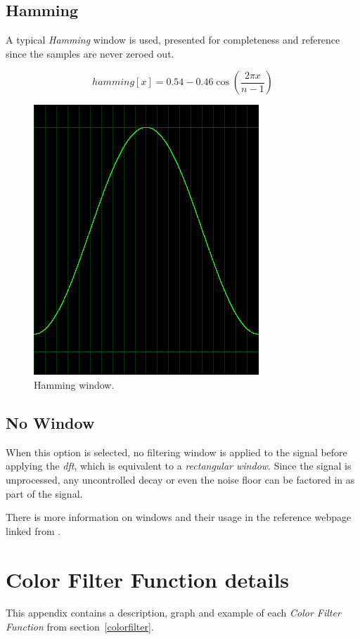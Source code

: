 \documentclass[10pt,a4paper]{report}
\newcommand{\ac}[1]{\textit{\mbox{\acrshort{#1}}}}
\begin{document}
\begin{appendices}
\section{Hamming}
A typical \textit{Hamming} window is used, presented for completeness and reference since the samples are never zeroed out.

\begin{equation}
hamming[x] = 0.54 - 0.46\cos(\frac{2\pi x}{n-1})
\end{equation}

\begin{figure}[H]
	\centering
	\includegraphics[width=0.4\linewidth]{images/windows/window-hamming.png}
	\caption[Hamming window]{Hamming window.}
	\label{fig:window-hamming}
\end{figure}

\section{No Window}

When this option is selected, no filtering window is applied to the signal before applying the \ac{dft}, which is equivalent to a \textit{rectangular window}. Since the signal is unprocessed, any uncontrolled decay or even the noise floor can be factored in as part of the signal.

There is more information on windows and their usage in the reference webpage linked from \cite{windowtypes}.

\chapter{Color Filter Function details}
\label{filterfunctions}

This appendix contains a description, graph and example of each \textit{Color Filter Function} from section~\ref{colorfilter}.


\end{appendices}
\end{document}
